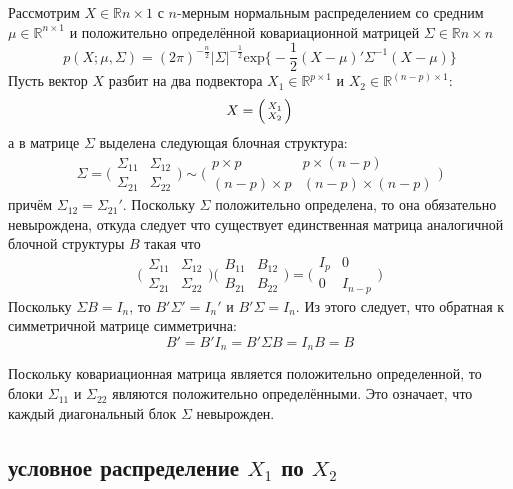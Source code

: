 \documentclass[a4paper]{article}
\newcommand{\Real}{\mathbb{R}}
\begin{document}
Рассмотрим $X\in \Real{n\times 1}$ с $n$-мерным нормальным распределением со средним
$\mu\in \Real^{n\times 1}$ и положительно определённой ковариационной матрицей
$\Sigma \in \Real{n\times n}$
\[
p(X;\mu,\Sigma)
= (2\pi)^{-\frac{n}{2}} \lvert \Sigma \rvert^{-\frac{1}{2}}
	\text{exp}\bigl\{-\frac{1}{2}(X-\mu)'\Sigma^{-1}(X-\mu)\bigr\}
\]
Пусть вектор $X$ разбит на два подвектора $X_1\in \Real^{p\times 1}$ и $X_2\in \Real^{(n-p)\times 1}$:
\[X = \Bigl(\begin{smallmatrix} X_1 \\ X_2 \end{smallmatrix}\Bigr)\]
а в матрице $\Sigma$ выделена следующая блочная структура:
\[
\Sigma
= \biggl(\begin{matrix}\Sigma_{11} & \Sigma_{12}\\\Sigma_{21} & \Sigma_{22}\end{matrix}\biggr)
\sim \biggl(\begin{matrix}p\times p & p\times (n-p)\\(n-p)\times p & (n-p)\times (n-p)\end{matrix}\biggr)
\]
причём $\Sigma_{12} = \Sigma_{21}'$. Поскольку $\Sigma$ положительно определена,
то она обязательно невырождена, откуда следует что существует единственная матрица
аналогичной блочной структуры $B$ такая что
\[
\biggl(\begin{matrix}\Sigma_{11} & \Sigma_{12}\\\Sigma_{21} & \Sigma_{22}\end{matrix}\biggr)
\biggl(\begin{matrix}B_{11} & B_{12}\\B_{21} & B_{22}\end{matrix}\biggr)
=
\biggl(\begin{matrix}I_p & 0\\0 & I_{n-p}\end{matrix}\biggr)
\]
Поскольку $\Sigma B = I_n$, то $B'\Sigma' = I_n'$ и $B'\Sigma = I_n$. Из этого следует,
что обратная к симметричной матрице симметрична:
\[B' = B' I_n = B' \Sigma B = I_n B = B\]

Поскольку ковариационная матрица является положительно определенной, то блоки
$\Sigma_{11}$ и $\Sigma_{22}$ являются положительно определёнными. Это означает,
что каждый диагональный блок $\Sigma$ невырожден.

\subsection*{условное распределение $X_1$ по $X_2$} %
\label{sub:conditional_x_1_x_2}
\end{document}
